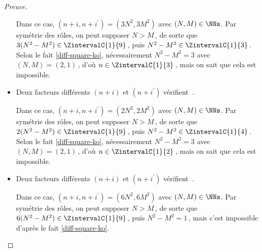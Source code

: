 \begin{proof}[Preuve]
\begin{itemize}
		\smallskip
		\noindent
		Dans ce cas, $(n+i, n+i^\prime) = (3 N^2, 3 M^2)$ avec $(N, M) \in \NNs$.
		Par symétrie des rôles, on peut supposer $N > M$\,, de sorte que $3(N^2 - M^2) \in \ZintervalC{1}{9}$\,, puis $N^2 - M^2 \in \ZintervalC{1}{3}$\,. 
		Selon le fait \ref{diff-square-ko}, nécessairement $N^2 - M^2 = 3$ avec $(N, M) = (2, 1)$\,, d'où $n \in \ZintervalC{1}{3}$\,, mais on sait que cela est impossible.


    	\medskip
		\item Deux facteurs différents $(n+i)$ et $(n+i^\prime)$ vérifient \,.
		
		\smallskip
		\noindent
		Dans ce cas, $(n+i, n+i^\prime) = (2 N^2, 2 M^2)$ avec $(N, M) \in \NNs$.
		Par symétrie des rôles, on peut supposer $N > M$\,, de sorte que $2(N^2 - M^2) \in \ZintervalC{1}{9}$\,, puis $N^2 - M^2 \in \ZintervalC{1}{4}$\,. 
		Selon le fait \ref{diff-square-ko}, nécessairement $N^2 - M^2 = 3$ avec $(N, M) = (2, 1)$\,, d'où $n \in \ZintervalC{1}{2}$\,, mais on sait que cela est impossible.


    	\medskip
		\item Deux facteurs différents $(n+i)$ et $(n+i^\prime)$ vérifient \,.
		
		\smallskip
		\noindent
		Dans ce cas, $(n+i, n+i^\prime) = (6 N^2, 6 M^2)$ avec $(N, M) \in \NNs$.
		Par symétrie des rôles, on peut supposer $N > M$\,, de sorte que $6(N^2 - M^2) \in \ZintervalC{1}{9}$\,, puis $N^2 - M^2 = 1$\,, mais c'est impossible d'après le fait \ref{diff-square-ko}.
		\qedhere
    \end{itemize}
\end{proof}

